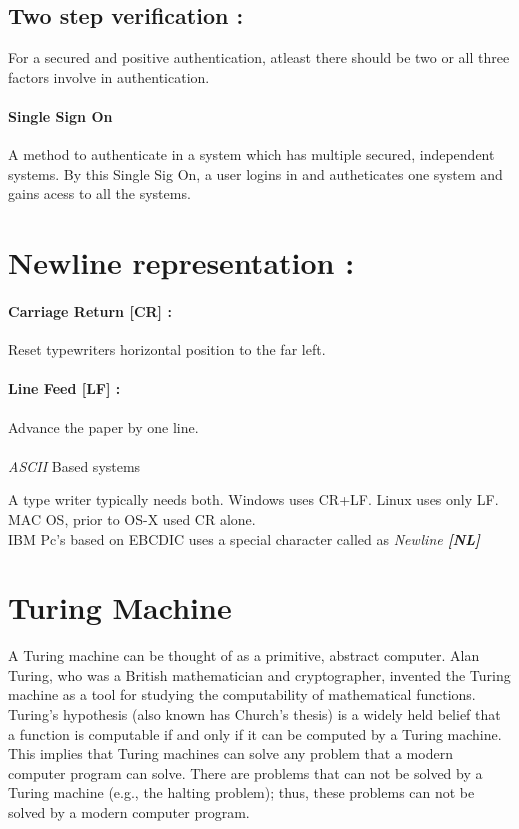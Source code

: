 \documentclass[12pt]{article}
\begin{document}
\subsection{Two step verification : }
For a secured and positive authentication, atleast there should be two or all three factors involve in authentication.
\paragraph{Single Sign On} A method to authenticate in a system which has multiple secured, independent systems. By this Single Sig On, a user logins in and autheticates one system and gains acess to all the systems.
\pagebreak
\section{Newline representation  : }

\paragraph{Carriage Return [CR] : } Reset typewriters horizontal position to the far left.
\paragraph{Line Feed [LF] : } Advance the paper by one line.
\\
\\
\textit{ASCII }Based systems 

A type writer typically needs both.
Windows uses CR+LF.
Linux uses only LF.
MAC OS, prior to OS-X used CR alone.
\\

IBM Pc's based on EBCDIC uses a special character called as \textit{Newline \textbf{[NL]}}
\pagebreak

\section{Turing Machine}

A Turing machine can be thought of as a primitive, abstract computer. Alan Turing, who was a British mathematician and cryptographer, invented the Turing machine as a tool for studying the computability of mathematical functions. Turing's hypothesis (also known has Church's thesis) is a widely held belief that a function is computable if and only if it can be computed by a Turing machine. This implies that Turing machines can solve any problem that a modern computer program can solve. There are problems that can not be solved by a Turing machine (e.g., the halting problem); thus, these problems can not be solved by a modern computer program.
\end{document}
